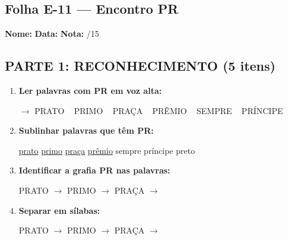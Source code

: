 \subsection{Folha E-11 --- Encontro PR}
\begin{exercicio}



\noindent\textbf{Nome:} \underline{\hspace{3.2cm}} \quad \textbf{Data:} \underline{\hspace{1.6cm}} \quad \textbf{Nota:} \underline{\hspace{0.9cm}}/15


\subsection*{PARTE 1: RECONHECIMENTO (5 itens)}

\begin{enumerate}

  \item \textbf{Ler palavras com PR em voz alta:}
  \begin{center}
  $\rightarrow$ PRATO ~ PRIMO ~ PRAÇA ~ PRÊMIO ~ SEMPRE ~ PRÍNCIPE
  \end{center}

  \item \textbf{Sublinhar palavras que têm PR:}

\begin{center}
  \uline{prato} \quad \uline{primo} \quad \uline{praça} \quad \uline{prêmio} \quad sempre \quad príncipe \quad preto
\end{center}

  \item \textbf{Identificar a grafia PR nas palavras:}
  \begin{center}
  PRATO $\rightarrow$ \underline{\hspace{1cm}} \quad PRIMO $\rightarrow$ \underline{\hspace{1cm}} \quad PRAÇA $\rightarrow$ \underline{\hspace{1cm}}
  \end{center}

  \item \textbf{Separar em sílabas:}
  \begin{center}
  PRATO $\rightarrow$ \underline{\hspace{1.2cm}} \quad PRIMO $\rightarrow$ \underline{\hspace{1.2cm}} \quad PRAÇA $\rightarrow$ \underline{\hspace{1.2cm}}
  \end{center}


\end{enumerate}
\end{exercicio}
